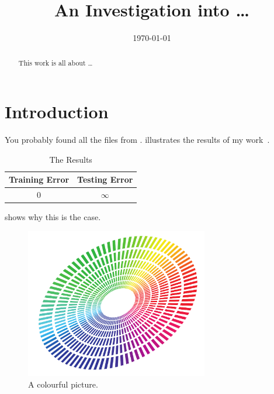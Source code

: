 \documentclass{ecsarticle}     %
\begin{document}
\frontmatter
\title      {An Investigation into \dots}
\addresses  {\groupname\\\deptname\\\univname}
\date       {\today}
\subject    {}
\keywords   {}
\maketitle
\begin{abstract}
This work is all about \dots
\end{abstract}
\tableofcontents
\listoffigures
\listoftables




\mainmatter
\section{Introduction} \label{Section:Introduction}
You probably found all the files from \cite{Gunn:2001:pdflatex}.
 illustrates the results of my work~\citep{Gunn:2011:updated2}.
\begin{table}[!htb]
  \centering
  \begin{tabular}{cc}
  \toprule
  \textbf{Training Error} & \textbf{Testing Error}\\
  \midrule
  0 & $\infty$\\
  \bottomrule
  \end{tabular}
  \caption{The Results}
  \label{Table:tabex}
\end{table}

 shows why this is the case.
\begin{figure}[!htb]
  \centering
  \includegraphics[width=8cm]{figure}
  \caption{A colourful picture.}
  \label{Figure:figex}
\end{figure}
\end{document}
